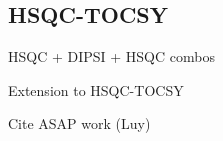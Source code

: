 \subsection{HSQC-TOCSY}
\label{subsec:noah__hsqctocsy}

HSQC + DIPSI + HSQC combos

Extension to HSQC-TOCSY

Cite ASAP work (Luy)
